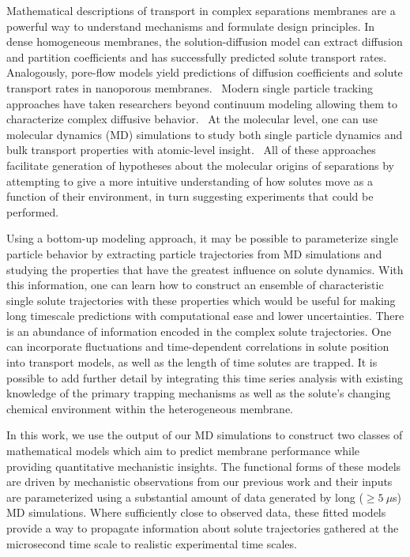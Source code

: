 \documentclass[journal=ancac3,manuscript=article,layout=twocolumn]{achemso}
\begin{document}
  Mathematical descriptions of transport in complex separations membranes are a
  powerful way to understand mechanisms and formulate design principles.
  \cite{vinh-thang_predictive_2013,geens_transport_2006,darvishmanesh_mass_2016}
  In dense homogeneous membranes, the solution-diffusion model
  can extract diffusion and partition coefficients and has successfully
  predicted solute transport rates.~\cite{wijmans_solution-diffusion_1995}
  Analogously, pore-flow models yield predictions of diffusion coefficients and
  solute transport rates in nanoporous membranes.~\cite{paul_diffusive_1974}
  Modern single particle tracking approaches have taken researchers beyond
  continuum modeling allowing them to characterize complex diffusive
  behavior.~\cite{manzo_review_2015} At the molecular level, one can use
  molecular dynamics (MD) simulations to study both single particle dynamics
  and bulk transport properties with atomic-level
  insight.~\cite{coscia_chemically_2019,maginn_best_2018} All of these
  approaches facilitate generation of hypotheses about the molecular origins of
  separations by attempting to give a more intuitive understanding of how
  solutes move as a function of their environment, in turn suggesting
  experiments that could be performed.

  Using a bottom-up modeling approach, it may be possible to parameterize single
  particle behavior by extracting particle trajectories from MD simulations and
  studying the properties that have the greatest influence on solute dynamics.
  With this information, one can learn how to construct an ensemble of characteristic
  single solute trajectories with these properties which would be useful for
  making long timescale predictions with computational ease and lower
  uncertainties. There is an abundance of information encoded in
  the complex solute trajectories. One can incorporate fluctuations and 
  time-dependent correlations in solute position into transport models, 
  as well as the length of time solutes are trapped. It is possible to add further
  detail by integrating this time series analysis with existing knowledge of the
  primary trapping mechanisms as well as the solute's changing chemical environment
  within the heterogeneous membrane. 

  In this work, we use the output of our MD simulations to construct two
  classes of mathematical models which aim to predict membrane performance
  while providing quantitative mechanistic insights. The functional forms of
  these models are driven by mechanistic observations from our previous work and
  their inputs are parameterized using a substantial amount of data generated
  by long ($\geq 5~\mu$s) MD simulations. Where sufficiently close to observed data,
  these fitted models provide a way to propagate information about solute 
  trajectories gathered at the microsecond time scale to realistic experimental 
  time scales. 
\end{document}

